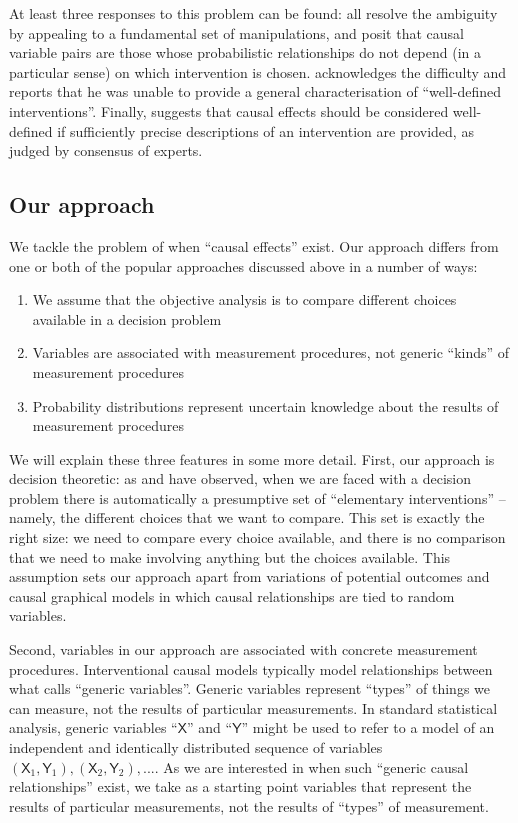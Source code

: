 \documentclass{article}
\theoremstyle{plain}
\theoremstyle{definition}
\newcommand{\RV}[1]{\ensuremath{\mathsf{#1}}}
\begin{document}
At least three responses to this problem can be found: \citet{spirtes_causal_2004,eberhardt_contemporary_2022,chalupka_causal_2017} all resolve the ambiguity by appealing to a fundamental set of manipulations, and posit that causal variable pairs are those whose probabilistic relationships do not depend (in a particular sense) on which intervention is chosen. \citet{woodward_causation_2016} acknowledges the difficulty and reports that he was unable to provide a general characterisation of ``well-defined interventions''. Finally, \citet{noauthor_does_2016} suggests that causal effects should be considered well-defined if sufficiently precise descriptions of an intervention are provided, as judged by consensus of experts.

\subsection{Our approach}

We tackle the problem of when ``causal effects'' exist. Our approach differs from one or both of the popular approaches discussed above in a number of ways:

\begin{enumerate}
  \item We assume that the objective analysis is to compare different choices available in a decision problem
  \item Variables are associated with measurement procedures, not generic ``kinds'' of measurement procedures
  \item Probability distributions represent uncertain knowledge about the results of measurement procedures
\end{enumerate}

We will explain these three features in some more detail. First, our approach is decision theoretic: as \citet{dawid_decision-theoretic_2020} and \citet{heckerman_decision-theoretic_1995} have observed, when we are faced with a decision problem there is automatically a presumptive set of ``elementary interventions'' -- namely, the different choices that we want to compare. This set is exactly the right size: we need to compare every choice available, and there is no comparison that we need to make involving anything but the choices available. This assumption sets our approach apart from variations of potential outcomes and causal graphical models in which causal relationships are tied to random variables.

Second, variables in our approach are associated with concrete measurement procedures. Interventional causal models typically model relationships between what \citet{dawid_decision-theoretic_2020} calls ``generic variables''. Generic variables represent ``types'' of things we can measure, not the results of particular measurements. In standard statistical analysis, generic variables ``$\RV{X}$'' and ``$\RV{Y}$'' might be used to refer to a model of an independent and identically distributed sequence of variables $(\RV{X}_1,\RV{Y}_1),(\RV{X}_2,\RV{Y}_2),...$. As we are interested in when such ``generic causal relationships'' exist, we take as a starting point variables that represent the results of particular measurements, not the results of ``types'' of measurement.
\end{document}
